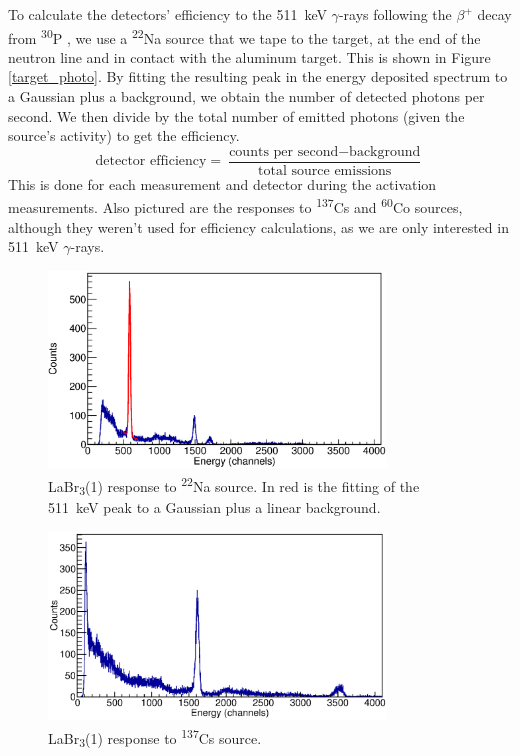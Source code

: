 \documentclass[a4paper,12pt]{report}
\newcommand{\Piso}{\textsuperscript{30}P }
\newcommand{\Na}{\textsuperscript{22}Na }
\begin{document}
To calculate the detectors' efficiency to the \qty{511}{\keV} $\gamma$-rays following the $\beta^+$ decay from \Piso, we use a \Na source that we tape to the target, at the end of the neutron line and in contact with the aluminum target.
This is shown in Figure \ref{target_photo}.
By fitting the resulting peak in the energy deposited spectrum to a Gaussian plus a background, we obtain the number of detected photons per second.
We then divide by the total number of emitted photons (given the source's activity) to get the efficiency.
\begin{equation}
	\text{detector efficiency} = \frac{\text{counts per second}-\text{background}}{\text{total source emissions}}
\end{equation}
This is done for each measurement and detector during the activation measurements.
Also pictured are the responses to \textsuperscript{137}Cs and \textsuperscript{60}Co sources, although they weren't used for efficiency calculations, as we are only interested in \qty{511}{\keV} $\gamma$-rays.

\begin{figure}[H]
	\centering
	\includegraphics[width=0.80\textwidth]{labr_na22_calibration.eps}
	\caption{LaBr\textsubscript{3}(1) response to \Na source. In red is the fitting of the \qty{511}{\keV} peak to a Gaussian plus a linear background.}
	\label{labr_na22_calibration}
\end{figure}

\begin{figure}[H]
	\centering
	\includegraphics[width=0.80\textwidth]{labr_cs137_calibration.eps}
	\caption{LaBr\textsubscript{3}(1) response to \textsuperscript{137}Cs source.}
	\label{labr_cs137_calibration}
\end{figure}
\end{document}
